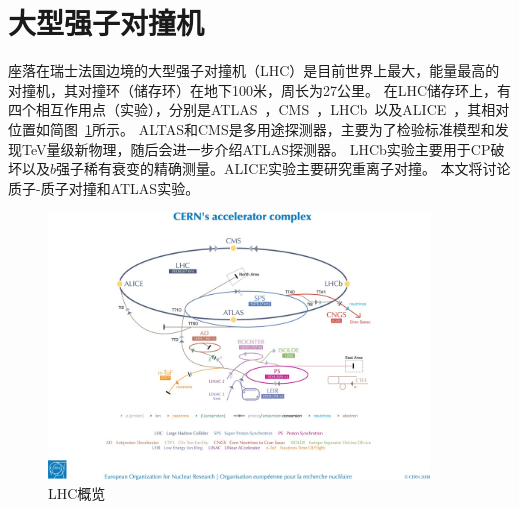 \section{大型强子对撞机} \label{sec:LHC}
座落在瑞士法国边境的大型强子对撞机（LHC）是目前世界上最大，能量最高的对撞机，其对撞环（储存环）在地下100米，周长为27公里。
在LHC储存环上，有四个相互作用点（实验），分别是ATLAS~\cite{ATLAS_Collaboration_2008}，CMS~\cite{CMS_Collaboration_2008}，LHCb~\cite{LHCb_Collaboration_2008}以及ALICE~\cite{ALICE_Collaboration_2008}，其相对位置如简图~\ref{fig:LHC_schematic}所示。
ALTAS和CMS是多用途探测器，主要为了检验标准模型和发现TeV量级新物理，随后会进一步介绍ATLAS探测器。
LHCb实验主要用于CP破坏以及$b$强子稀有衰变的精确测量。ALICE实验主要研究重离子对撞。
本文将讨论质子-质子对撞和ATLAS实验。
\begin{figure}[h]
\begin{center}
\includegraphics[width = 0.9\textwidth,angle=-90]{fig/LHC-shematic.jpg}
\caption{LHC概览} \label{fig:LHC_schematic}
\end{center}
\end{figure}

